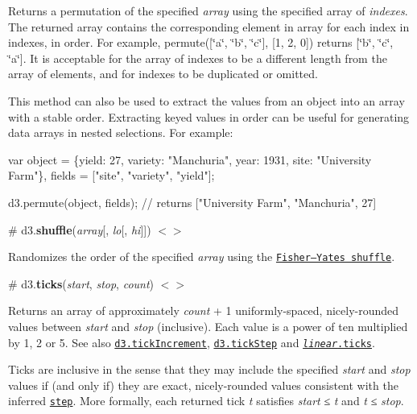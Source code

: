 Returns a permutation of the specified {\itshape array} using the specified array of {\itshape indexes}. The returned array contains the corresponding element in array for each index in indexes, in order. For example, permute(\mbox{[}\char`\"{}a\char`\"{}, \char`\"{}b\char`\"{}, \char`\"{}c\char`\"{}\mbox{]}, \mbox{[}1, 2, 0\mbox{]}) returns \mbox{[}\char`\"{}b\char`\"{}, \char`\"{}c\char`\"{}, \char`\"{}a\char`\"{}\mbox{]}. It is acceptable for the array of indexes to be a different length from the array of elements, and for indexes to be duplicated or omitted.

This method can also be used to extract the values from an object into an array with a stable order. Extracting keyed values in order can be useful for generating data arrays in nested selections. For example\+:


\begin{DoxyCode}
var object = \{yield: 27, variety: "Manchuria", year: 1931, site: "University Farm"\},
    fields = ["site", "variety", "yield"];

d3.permute(object, fields); // returns ["University Farm", "Manchuria", 27]
\end{DoxyCode}


\label{_shuffle}%
\# d3.{\bfseries shuffle}({\itshape array}\mbox{[}, {\itshape lo}\mbox{[}, {\itshape hi}\mbox{]}\mbox{]}) \href{https://github.com/d3/d3-array/blob/master/src/shuffle.js}{\tt $<$$>$}

Randomizes the order of the specified {\itshape array} using the \href{http://bost.ocks.org/mike/shuffle/}{\tt Fisher–\+Yates shuffle}.

\label{_ticks}%
\# d3.{\bfseries ticks}({\itshape start}, {\itshape stop}, {\itshape count}) \href{https://github.com/d3/d3-array/blob/master/src/ticks.js}{\tt $<$$>$}

Returns an array of approximately {\itshape count} + 1 uniformly-\/spaced, nicely-\/rounded values between {\itshape start} and {\itshape stop} (inclusive). Each value is a power of ten multiplied by 1, 2 or 5. See also \href{#tickIncrement}{\tt d3.\+tick\+Increment}, \href{#tickStep}{\tt d3.\+tick\+Step} and \href{https://github.com/d3/d3-scale/blob/master/README.md#linear_ticks}{\tt {\itshape linear}.ticks}.

Ticks are inclusive in the sense that they may include the specified {\itshape start} and {\itshape stop} values if (and only if) they are exact, nicely-\/rounded values consistent with the inferred \href{#tickStep}{\tt step}. More formally, each returned tick {\itshape t} satisfies {\itshape start} ≤ {\itshape t} and {\itshape t} ≤ {\itshape stop}.

